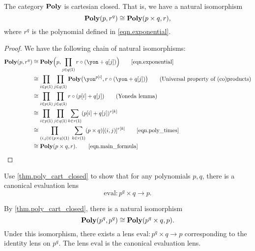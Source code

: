 \documentclass[Book-Poly]{subfiles}
\begin{document}
\begin{theorem}\label{thm.poly_cart_closed}
The category $\mathbf{Poly}$ is cartesian closed. That is, we have a natural isomorphism
\[
    \mathbf{Poly}(p,r^q) \cong \mathbf{Poly}(p\times q,r),
\]
where $r^q$ is the polynomial defined in \eqref{eqn.exponential}.
\end{theorem}
\begin{proof}
We have the following chain of natural isomorphisms:
\begin{align*}
	\poly(p, r^q) &\iso
	\poly\Big(p, \prod_{j \in q(\1)} r \circ (\yon+q[j])\Big)
	\tag*{\eqref{eqn.exponential}} \\
	&\iso
	\prod_{i\in p(\1)}\prod_{j\in q(\1)}\poly\big(\yon^{p[i]},r\circ(\yon+q[j])\big)
	\tag{Universal property of (co)products} \\
	&\iso
	\prod_{i\in p(\1)}\prod_{j\in q(\1)}r\circ(p[i]+q[j])
	\tag{Yoneda lemma} \\
	&\iso
	\prod_{i\in p(\1)}\prod_{j\in q(\1)}\sum_{k\in r(\1)}(p[i]+q[j])^{r[k]}
	\\
	&\iso
	\prod_{(i,j) \in (p \times q)(\1)} \; \sum_{k\in r(\1)}(p \times q)[(i, j)]^{r[k]}
	\tag*{\eqref{eqn.poly_times}} \\
	&\iso
	\poly(p \times q,r).
	\tag*{\eqref{eqn.main_formula}}
\end{align*}
\end{proof}

\begin{exercise}
Use \cref{thm.poly_cart_closed} to show that for any polynomials $p,q$, there is a canonical evaluation lens
\begin{equation*}%
	\text{eval}\colon p^q \times q \to p.
\end{equation*}
\begin{solution}
By \cref{thm.poly_cart_closed}, there is a natural isomorphism
\[
    \mathbf{Poly}(p^q, p^q) \cong \mathbf{Poly}(p^q \times q, p).
\]
Under this isomorphism, there exists a lens $\text{eval} \colon p^q \times q \to p$ corresponding to the identity lens on $p^q$.
The lens $\text{eval}$ is the canonical evaluation lens.
\end{solution}
\end{exercise}

\end{document}
